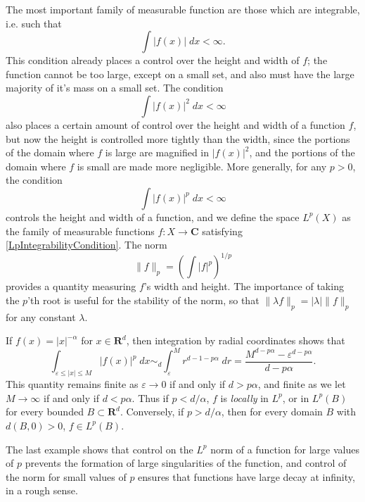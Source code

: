 The most important family of measurable function are those which are integrable, i.e. such that
%
\[ \int |f(x)|\; dx < \infty. \]
%
This condition already places a control over the height and width of $f$; the function cannot be too large, except on a small set, and also must have the large majority of it's mass on a small set. The condition
%
\[ \int |f(x)|^2\; dx < \infty \]
%
also places a certain amount of control over the height and width of a function $f$, but now the height is controlled more tightly than the width, since the portions of the domain where $f$ is large are magnified in $|f(x)|^2$, and the portions of the domain where $f$ is small are made more negligible. More generally, for any $p > 0$, the condition
%
\begin{equation} \label{LpIntegrabilityCondition}
  \int |f(x)|^p\; dx < \infty
\end{equation}
%
controls the height and width of a function, and we define the space $L^p(X)$ as the family of measurable functions $f: X \to \mathbf{C}$ satisfying \eqref{LpIntegrabilityCondition}. The norm
%
\[ \| f \|_p = \left( \int |f|^p \right)^{1/p} \]
%
provides a quantity measuring $f$'s width and height. The importance of taking the $p$'th root is useful for the stability of the norm, so that $\| \lambda f \|_p = |\lambda| \| f \|_p$ for any constant $\lambda$.

\begin{example}
  If $f(x) = |x|^{-\alpha}$ for $x \in \mathbf{R}^d$, then integration by radial coordinates shows that
  \[ \int_{\varepsilon \leq |x| \leq M} |f(x)|^p\; dx \sim_d \int_\varepsilon^M r^{d-1 - p\alpha}\; dr = \frac{M^{d - p \alpha} - \varepsilon^{d - p \alpha}}{d - p \alpha}. \]
  This quantity remains finite as $\varepsilon \to 0$ if and only if $d > p \alpha$, and finite as we let $M \to \infty$ if and only if $d < p \alpha$. Thus if $p < d/\alpha$, $f$ is \emph{locally} in $L^p$, or in $L^p(B)$ for every bounded $B \subset \mathbf{R}^d$. Conversely, if $p > d/\alpha$, then for every domain $B$ with $d(B,0) > 0$, $f \in L^p(B)$.
\end{example}

The last example shows that control on the $L^p$ norm of a function for large values of $p$ prevents the formation of large singularities of the function, and control of the norm for small values of $p$ ensures that functions have large decay at infinity, in a rough sense.

